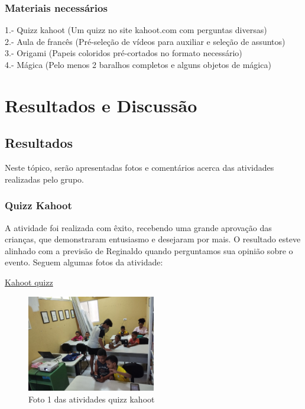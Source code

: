 \documentclass[a4paper,12pt]{article}
\begin{document}
\subsubsection{Materiais necessários}\vspace{0.3cm}
1.- Quizz kahoot (Um quizz no site kahoot.com com perguntas diversas)\\
2.- Aula de francês (Pré-seleção de vídeos para auxiliar e seleção de assuntos)\\
3.- Origami (Papeis coloridos pré-cortados no formato necessário)\\
4.- Mágica (Pelo menos 2 baralhos completos e alguns objetos de mágica)\vspace{0.2cm}\\

\section{\LARGE{Resultados e Discussão}}
\vspace{0.5cm}

\subsection{\Large{Resultados}}
\vspace{0.2cm}
Neste tópico, serão apresentadas fotos e comentários acerca das atividades realizadas pelo grupo.

\subsubsection{Quizz Kahoot}
A atividade foi realizada com êxito, recebendo uma grande aprovação das crianças, que demonstraram entusiasmo e desejaram por mais. O resultado esteve alinhado com a previsão de Reginaldo quando perguntamos sua opinião sobre o evento. Seguem algumas fotos da atividade:

\vspace{1cm}


\href{https://play.kahoot.it/v2/?quizId=28a22c69-5679-45eb-b411-e55ef0a63311}{Kahoot quizz}\\

\begin{figure}[h]
    \centering
    \includegraphics[width=0.5\textwidth]{image.png}
    \caption{Foto 1 das atividades quizz kahoot}
    \label{fig:foto1505}
\end{figure}
\end{document}
